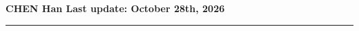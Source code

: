 \documentclass[10pt]{article}
\newcommand{\makeheading}[1]%
        {\hspace*{-\marginparsep minus \marginparwidth}%
         \begin{minipage}[t]{\textwidth+\marginparwidth+\marginparsep}%
                {\large \bfseries #1}\\[-0.15\baselineskip]%
                 \rule{\columnwidth}{1pt}%
         \end{minipage}}
\renewcommand{\section}[2]%
        {\pagebreak[2]\vspace{1\baselineskip}%
         \phantomsection\addcontentsline{toc}{section}{#1}%
         \hspace{0in}%
         \marginpar{
         \raggedright \scshape #1}#2}
\newenvironment{outerlist}[1][\enskip\textbullet]%
        {%
        \begin{itemize}[label=#1, itemsep=1pt]}{\end{itemize}%
         \vspace{-0.6\baselineskip}}
\def\vs{\vspace{-0.1in}}
\begin{document}



\newlength{\rcollength}\setlength{\rcollength}{3 in}
\vs

\vspace{0.2in}


	
\makeheading{CHEN Han \hfill {\small Last update: October 28th, 2026}}

\vspace{-0.2in}
\end{document}
